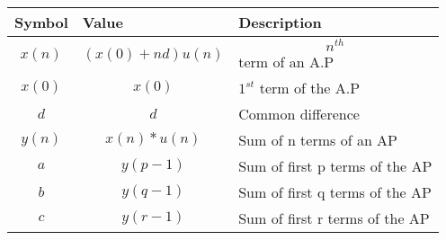 \begin{tabular}{|p{2cm}|p{2.80cm}|p{2.70cm}|}
    \hline
    Symbol&Value&Description\\ \hline
    $$x(n)$$&$$(x(0)+nd)u(n)$$&$$n^{th}$$ term of an A.P\\ \hline
    $$x(0)$$&$$x(0)$$&$1^{st}$ term of the A.P\\ \hline
    $$d$$&$$d$$&Common difference\\ \hline
    $$y(n)$$&$$x(n)\ast u(n)$$&Sum of n terms of an AP\\ \hline
    $$a$$&$$y(p-1)$$&Sum of first p terms of the AP\\ \hline
    $$b$$&$$y(q-1)$$&Sum of first q terms of the AP\\ \hline
    $$c$$&$$y(r-1)$$&Sum of first r terms of the AP\\ \hline
\end{tabular}